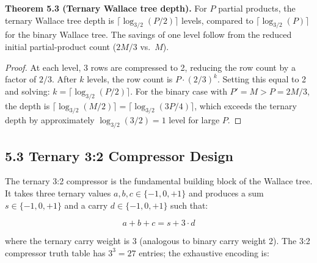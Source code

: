 \textbf{Theorem 5.3 (Ternary Wallace tree depth).} For \(P\) partial
products, the ternary Wallace tree depth is
\(\lceil \log_{3/2}(P/2) \rceil\) levels, compared to
\(\lceil \log_{3/2}(P) \rceil\) for the binary Wallace tree. The
savings of one level follow from the reduced initial partial-product
count (\(2M/3\) vs.\ \(M\)).

\begin{proof}
At each level, 3 rows are compressed to 2, reducing the row count
by a factor of \(2/3\). After \(k\) levels, the row count is
\(P \cdot (2/3)^k\). Setting this equal to 2 and solving:
\(k = \lceil \log_{3/2}(P/2) \rceil\). For the binary case with
\(P' = M > P = 2M/3\), the depth is
\(\lceil \log_{3/2}(M/2) \rceil =
\lceil \log_{3/2}(3P/4) \rceil\), which exceeds the ternary depth
by approximately
\(\log_{3/2}(3/2) = 1\) level for large \(P\).
\end{proof}

\subsection{5.3 Ternary 3:2 Compressor Design}

The ternary 3:2 compressor is the fundamental building block of the
Wallace tree. It takes three ternary values \(a, b, c \in \{-1,0,+1\}\)
and produces a sum \(s \in \{-1,0,+1\}\) and a carry
\(d \in \{-1,0,+1\}\) such that:

\[
a + b + c = s + 3 \cdot d
\]

where the ternary carry weight is 3 (analogous to binary carry weight
2). The 3:2 compressor truth table has \(3^3 = 27\) entries; the
exhaustive encoding is:

